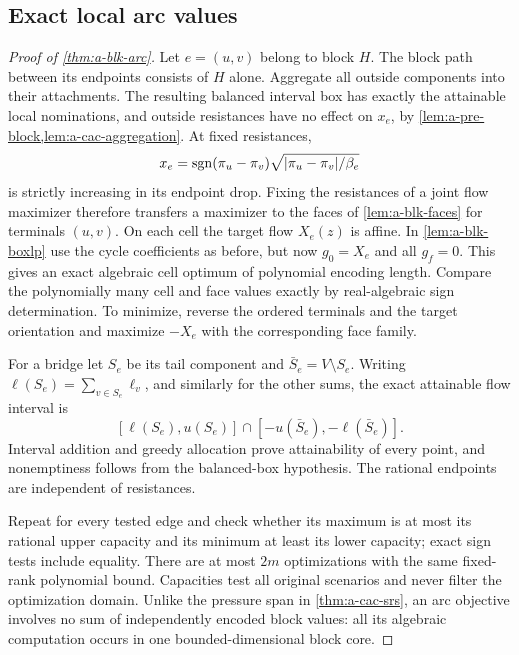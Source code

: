 \subsection{Exact local arc values}
\begin{proof}[Proof of \cref{thm:a-blk-arc}]
Let $e=(u,v)$ belong to block $H$. The block path between its endpoints
consists of $H$ alone. Aggregate all outside components into their
attachments. The resulting balanced interval box has exactly the
attainable local nominations, and outside resistances have no effect
on $x_e$, by \cref{lem:a-pre-block,lem:a-cac-aggregation}.
At fixed resistances,
\[
 x_e=\operatorname{sgn}(\pi_u-\pi_v)\sqrt{|\pi_u-\pi_v|/\beta_e}
\]
is strictly increasing in its endpoint drop. Fixing the resistances of
a joint flow maximizer therefore transfers a maximizer to the faces of
\cref{lem:a-blk-faces} for terminals $(u,v)$.
On each cell the target flow $X_e(z)$ is affine. In
\cref{lem:a-blk-boxlp} use the cycle coefficients as before, but now
$g_0=X_e$ and all $g_f=0$. This gives an exact algebraic cell optimum
of polynomial encoding length. Compare the polynomially many cell
and face values exactly by real-algebraic sign determination.
To minimize, reverse the ordered terminals and the target orientation
and maximize $-X_e$ with the corresponding face family.

For a bridge let $S_e$ be its tail component and $\bar S_e=V\setminus S_e$.
Writing $\ell(S_e)=\sum_{v\in S_e}\ell_v$, and similarly for the other
sums, the exact attainable flow interval is
\[
 [\ell(S_e),u(S_e)]\cap[-u(\bar S_e),-\ell(\bar S_e)].
\]
Interval addition and greedy allocation prove attainability of every
point, and nonemptiness follows from the balanced-box hypothesis. The
rational endpoints are independent of resistances.

Repeat for every tested edge and check whether its maximum is at most
its rational upper capacity and its minimum at least its lower capacity;
exact sign tests include equality. There are at most $2m$ optimizations
with the same fixed-rank polynomial bound. Capacities test all original
scenarios and never filter the optimization domain.
Unlike the pressure span in \cref{thm:a-cac-srs}, an arc objective
involves no sum of independently encoded block values: all its
algebraic computation occurs in one bounded-dimensional block core.
\end{proof}


